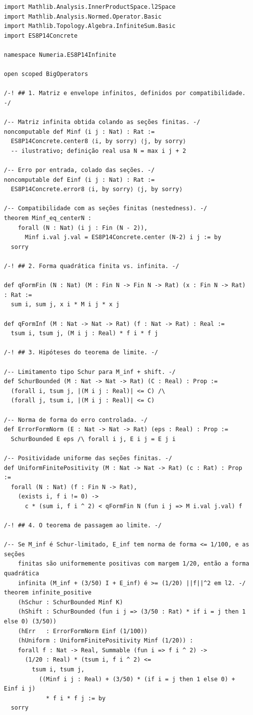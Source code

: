 \documentclass[11pt,a4paper]{article}
\theoremstyle{definition}
\theoremstyle{remark}
\begin{document}
\begin{lstlisting}[language=Lean4,caption={Esqueleto Lean 4 para a passagem ao limite infinito.}]
import Mathlib.Analysis.InnerProductSpace.l2Space
import Mathlib.Analysis.Normed.Operator.Basic
import Mathlib.Topology.Algebra.InfiniteSum.Basic
import ES8P14Concrete

namespace Numeria.ES8P14Infinite

open scoped BigOperators

/-! ## 1. Matriz e envelope infinitos, definidos por compatibilidade. -/

/-- Matriz infinita obtida colando as seções finitas. -/
noncomputable def Minf (i j : Nat) : Rat :=
  ES8P14Concrete.center8 ⟨i, by sorry⟩ ⟨j, by sorry⟩
  -- ilustrativo; definição real usa N = max i j + 2

/-- Erro por entrada, colado das seções. -/
noncomputable def Einf (i j : Nat) : Rat :=
  ES8P14Concrete.error8 ⟨i, by sorry⟩ ⟨j, by sorry⟩

/-- Compatibilidade com as seções finitas (nestedness). -/
theorem Minf_eq_centerN :
    forall (N : Nat) (i j : Fin (N - 2)),
      Minf i.val j.val = ES8P14Concrete.center (N-2) i j := by
  sorry

/-! ## 2. Forma quadrática finita vs. infinita. -/

def qFormFin (N : Nat) (M : Fin N -> Fin N -> Rat) (x : Fin N -> Rat) : Rat :=
  sum i, sum j, x i * M i j * x j

def qFormInf (M : Nat -> Nat -> Rat) (f : Nat -> Rat) : Real :=
  tsum i, tsum j, (M i j : Real) * f i * f j

/-! ## 3. Hipóteses do teorema de limite. -/

/-- Limitamento tipo Schur para M_inf + shift. -/
def SchurBounded (M : Nat -> Nat -> Rat) (C : Real) : Prop :=
  (forall i, tsum j, |(M i j : Real)| <= C) /\
  (forall j, tsum i, |(M i j : Real)| <= C)

/-- Norma de forma do erro controlada. -/
def ErrorFormNorm (E : Nat -> Nat -> Rat) (eps : Real) : Prop :=
  SchurBounded E eps /\ forall i j, E i j = E j i

/-- Positividade uniforme das seções finitas. -/
def UniformFinitePositivity (M : Nat -> Nat -> Rat) (c : Rat) : Prop :=
  forall (N : Nat) (f : Fin N -> Rat),
    (exists i, f i != 0) ->
      c * (sum i, f i ^ 2) < qFormFin N (fun i j => M i.val j.val) f

/-! ## 4. O teorema de passagem ao limite. -/

/-- Se M_inf é Schur-limitado, E_inf tem norma de forma <= 1/100, e as seções
    finitas são uniformemente positivas com margem 1/20, então a forma quadrática
    infinita (M_inf + (3/50) I + E_inf) é >= (1/20) ||f||^2 em l2. -/
theorem infinite_positive
    (hSchur : SchurBounded Minf K)
    (hShift : SchurBounded (fun i j => (3/50 : Rat) * if i = j then 1 else 0) (3/50))
    (hErr   : ErrorFormNorm Einf (1/100))
    (hUniform : UniformFinitePositivity Minf (1/20)) :
    forall f : Nat -> Real, Summable (fun i => f i ^ 2) ->
      (1/20 : Real) * (tsum i, f i ^ 2) <=
        tsum i, tsum j,
          ((Minf i j : Real) + (3/50) * (if i = j then 1 else 0) + Einf i j)
            * f i * f j := by
  sorry


\end{lstlisting}
\end{document}
